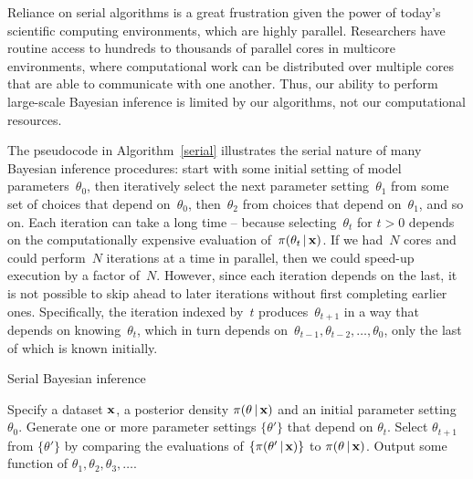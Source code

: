 \documentclass[angelino.tex]{subfiles}
\begin{document}
Reliance on serial algorithms is a great frustration given the power of today's
scientific computing environments, which are highly parallel.
Researchers have routine access to hundreds to thousands of parallel cores in
multicore environments, where computational work can be distributed over
multiple cores that are able to communicate with one another.
Thus, our ability to perform large-scale Bayesian inference is
limited by our algorithms, not our computational resources.

The pseudocode in Algorithm~\ref{serial} illustrates the serial nature of
many Bayesian inference procedures:
start with some initial setting of model parameters~$\theta_0$,
then iteratively select the next parameter setting~$\theta_1$ from some
set of choices that depend on~$\theta_0$, 
then~$\theta_2$ from choices that depend on~$\theta_1$, and so on.
Each iteration can take a long time --
\eg because selecting~$\theta_{t}$ for $t > 0$ depends on the
computationally expensive evaluation of~$\pi(\theta_t \,|\, \mathbf{x})$.
If we had~$N$ cores and could perform~$N$ iterations at a time in parallel,
then we could speed-up execution by a factor of~$N$.
However, since each iteration depends on the last, it is not possible to skip
ahead to later iterations without first completing earlier ones.
Specifically, the iteration indexed by~$t$ produces~$\theta_{t+1}$ in a way that 
depends on knowing~$\theta_t$, which in turn depends
on~${\theta_{t-1}, \theta_{t-2}, \dots, \theta_0}$,
only the last of which is known initially.

\begin{algorithm}[t]
\caption{Serial Bayesian inference}
\label{serial}
\begin{algorithmic}
\State Specify a dataset $\mathbf{x}$, a posterior density $\pi(\theta \,|\, \mathbf{x})$
and an initial parameter setting $\theta_0$.
\State Generate one or more parameter settings $\{\theta'\}$
that depend on $\theta_t$.
\State Select $\theta_{t+1}$ from $\{\theta'\}$ by comparing
the evaluations of $\{\pi(\theta' \,|\, \mathbf{x})\}$ to $\pi(\theta \,|\, \mathbf{x})$.
\EndFor
\State Output some function of $\theta_1, \theta_2, \theta_3, \dots$.
\end{algorithmic}
\end{algorithm}
\vspace{1em}

\end{document}
